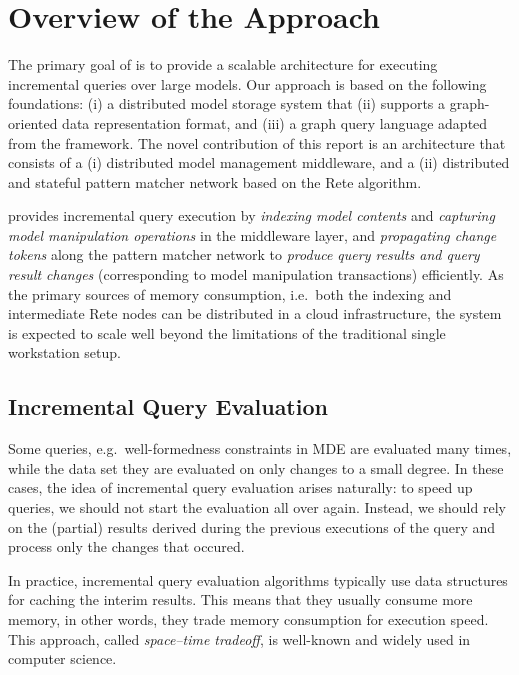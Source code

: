 \chapter{Overview of the Approach}
\label{chap:overview}

The primary goal of \iqd{} is to provide a scalable architecture for executing incremental queries over large models. Our approach is based on the following foundations: (i) a distributed model storage system that (ii) supports a graph-oriented data representation format, and (iii) a graph query language adapted from the \eiq{} framework. The novel contribution of this report is an architecture that consists of a (i) distributed model management middleware, and a (ii) distributed and stateful pattern matcher network based on the Rete algorithm.

\iqd{} provides incremental query execution by \emph{indexing model contents} and \emph{capturing model manipulation operations} in the middleware layer, and \emph{propagating change tokens} along the pattern matcher network to \emph{produce query results and query result changes} (corresponding to model manipulation transactions) efficiently. As the primary sources of memory consumption, i.e.\ both the indexing and intermediate Rete nodes can be distributed in a cloud infrastructure, the system is expected to scale well beyond the limitations of the traditional single workstation setup.


\section{Incremental Query Evaluation}
\label{rete}

Some queries, e.g.\ well-formedness constraints in MDE are evaluated many times, while the data set they are evaluated on only changes to a small degree. In these cases, the idea of incremental query evaluation arises naturally: to speed up queries, we should not start the evaluation all over again. Instead, we should rely on the (partial) results derived during the previous executions of the query and process only the changes that occured.
 
In practice, incremental query evaluation algorithms typically use data structures for caching the interim results. This  means that they usually consume more memory, in other words, they trade memory consumption for execution speed. This approach, called \emph{space--time tradeoff}, is well-known and widely used in computer science.

